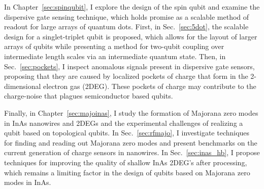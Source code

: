 In Chapter~\ref{sec:spinqubit}, I explore the design of the spin qubit and examine the dispersive gate sensing technique,
which holds promise as a scalable method of readout for large arrays of quantum dots. First, in Sec.~\ref{sec:5dot},
the scalable design for a singlet-triplet qubit is proposed, which allows for the layout of larger arrays of qubits
while presenting a method for two-qubit coupling over intermediate length scales via an intermediate quantum state.
Then, in Sec.~\ref{sec:pockets}, I inspect anomalous signals present in dispersive gate sensors, proposing that they
are caused by localized pockets of charge that form in the 2-dimensional electron gas (2DEG). These pockets of charge may
contribute to the charge-noise that plagues semiconductor based qubits.

Finally, in Chapter~\ref{sec:majoinas}, I study the formation of Majorana zero modes in InAs nanowires and
2DEGs and the experimental challenges of realizing a qubit based on topological qubits. In Sec.~\ref{sec:rfmajo}, I investigate
techniques for finding and reading out Majorana zero modes and present benchmarks on the current
generation of charge sensors in nanowires. In Sec.~\ref{sec:inas_hb}, I propose techniques for improving the quality
of shallow InAs 2DEG's after processing, which remains a limiting factor in the design of qubits based on Majorana zero
modes in InAs.